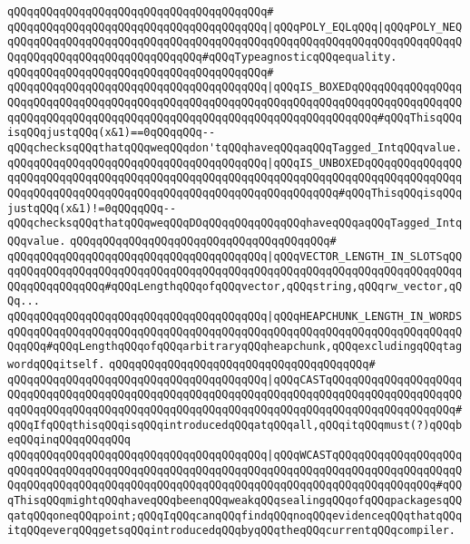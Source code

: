 \verb|qQQqqQQqqQQqqQQqqQQqqQQqqQQqqQQqqQQqqQQq#|\newline
\verb|qQQqqQQqqQQqqQQqqQQqqQQqqQQqqQQqqQQqqQQq|\verb#|qQQqPOLY_EQLqQQq|qQQqPOLY_NEQqQQqqQQqqQQqqQQqqQQqqQQqqQQqqQQqqQQqqQQqqQQqqQQqqQQqqQQqqQQqqQQqqQQqqQQqqQQqqQQqqQQqqQQqqQQqqQQqqQQq#\verb|#qQQqTypeagnosticqQQqequality.|\newline
\verb|qQQqqQQqqQQqqQQqqQQqqQQqqQQqqQQqqQQqqQQq#|\newline
\verb|qQQqqQQqqQQqqQQqqQQqqQQqqQQqqQQqqQQqqQQq|\verb#|qQQqIS_BOXEDqQQqqQQqqQQqqQQqqQQqqQQqqQQqqQQqqQQqqQQqqQQqqQQqqQQqqQQqqQQqqQQqqQQqqQQqqQQqqQQqqQQqqQQqqQQqqQQqqQQqqQQqqQQqqQQqqQQqqQQqqQQqqQQqqQQqqQQqqQQqqQQq#\verb|#qQQqThisqQQqisqQQqjustqQQq(x&1)==0qQQqqQQq--qQQqchecksqQQqthatqQQqweqQQqdon'tqQQqhaveqQQqaqQQqTagged_IntqQQqvalue.|\newline
\verb|qQQqqQQqqQQqqQQqqQQqqQQqqQQqqQQqqQQqqQQq|\verb#|qQQqIS_UNBOXEDqQQqqQQqqQQqqQQqqQQqqQQqqQQqqQQqqQQqqQQqqQQqqQQqqQQqqQQqqQQqqQQqqQQqqQQqqQQqqQQqqQQqqQQqqQQqqQQqqQQqqQQqqQQqqQQqqQQqqQQqqQQqqQQqqQQqqQQq#\verb|#qQQqThisqQQqisqQQqjustqQQq(x&1)!=0qQQqqQQq--qQQqchecksqQQqthatqQQqweqQQqDOqQQqqQQqqQQqqQQqhaveqQQqaqQQqTagged_IntqQQqvalue.|\newline
\verb|qQQqqQQqqQQqqQQqqQQqqQQqqQQqqQQqqQQqqQQq#|\newline
\verb|qQQqqQQqqQQqqQQqqQQqqQQqqQQqqQQqqQQqqQQq|\verb#|qQQqVECTOR_LENGTH_IN_SLOTSqQQqqQQqqQQqqQQqqQQqqQQqqQQqqQQqqQQqqQQqqQQqqQQqqQQqqQQqqQQqqQQqqQQqqQQqqQQqqQQqqQQqqQQq#\verb|#qQQqLengthqQQqofqQQqvector,qQQqstring,qQQqrw_vector,qQQq...|\newline
\verb|qQQqqQQqqQQqqQQqqQQqqQQqqQQqqQQqqQQqqQQq|\verb#|qQQqHEAPCHUNK_LENGTH_IN_WORDSqQQqqQQqqQQqqQQqqQQqqQQqqQQqqQQqqQQqqQQqqQQqqQQqqQQqqQQqqQQqqQQqqQQqqQQqqQQq#\verb|#qQQqLengthqQQqofqQQqarbitraryqQQqheapchunk,qQQqexcludingqQQqtagwordqQQqitself.|\newline
\verb|qQQqqQQqqQQqqQQqqQQqqQQqqQQqqQQqqQQqqQQq#|\newline
\verb|qQQqqQQqqQQqqQQqqQQqqQQqqQQqqQQqqQQqqQQq|\verb#|qQQqCASTqQQqqQQqqQQqqQQqqQQqqQQqqQQqqQQqqQQqqQQqqQQqqQQqqQQqqQQqqQQqqQQqqQQqqQQqqQQqqQQqqQQqqQQqqQQqqQQqqQQqqQQqqQQqqQQqqQQqqQQqqQQqqQQqqQQqqQQqqQQqqQQqqQQqqQQqqQQqqQQq#\verb|#qQQqIfqQQqthisqQQqisqQQqintroducedqQQqatqQQqall,qQQqitqQQqmust(?)qQQqbeqQQqinqQQqqQQqqQQq|\newline
\verb|qQQqqQQqqQQqqQQqqQQqqQQqqQQqqQQqqQQqqQQq|\verb#|qQQqWCASTqQQqqQQqqQQqqQQqqQQqqQQqqQQqqQQqqQQqqQQqqQQqqQQqqQQqqQQqqQQqqQQqqQQqqQQqqQQqqQQqqQQqqQQqqQQqqQQqqQQqqQQqqQQqqQQqqQQqqQQqqQQqqQQqqQQqqQQqqQQqqQQqqQQqqQQqqQQq#\verb|#qQQqThisqQQqmightqQQqhaveqQQqbeenqQQqweakqQQqsealingqQQqofqQQqpackagesqQQqatqQQqoneqQQqpoint;qQQqIqQQqcanqQQqfindqQQqnoqQQqevidenceqQQqthatqQQqitqQQqeverqQQqgetsqQQqintroducedqQQqbyqQQqtheqQQqcurrentqQQqcompiler.|\newline
